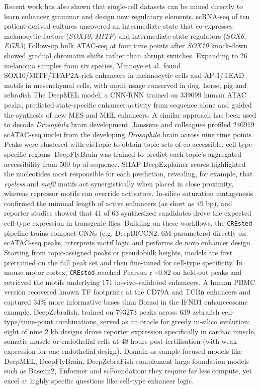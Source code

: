 Recent work has also shown that single-cell datasets can be mined directly to learn enhancer grammar and design new regulatory elements. scRNA-seq of ten patient-derived cultures uncovered an intermediate state that co-expresses melanocytic factors (\textit{SOX10}, \textit{MITF}) and intermediate-state regulators (\textit{SOX6}, \textit{EGR3}) Follow-up bulk ATAC-seq at four time points after \textit{SOX10} knock-down showed gradual chromatin shifts rather than abrupt switches. Expanding to 26 melanoma samples from six species, Minnoye et al. found SOX10/MITF/TFAP2A-rich enhancers in melanocytic cells and AP-1/TEAD motifs in mesenchymal cells, with motif usage conserved in dog, horse, pig and zebrafish The DeepMEL model, a CNN-RNN trained on \num{339099} human ATAC peaks, predicted state-specific enhancer activity from sequence alone and guided the synthesis of new MES and MEL enhancers. A similar approach has been used to decode \textit{Drosophila} brain development. Janssens and colleagues profiled \num{240919} scATAC-seq nuclei from the developing \textit{Drosophila} brain across nine time points Peaks were clustered with cisTopic to obtain topic sets of co-accessible, cell-type-specific regions. DeepFlyBrain was trained to predict each topic's aggregated accessibility from 500 bp of sequence. SHAP DeepExplainer scores highlighted the nucleotides most responsible for each prediction, revealing, for example, that \textit{eyeless} and \textit{mef2} motifs act synergistically when placed in close proximity, whereas repressor motifs can override activators. In-silico saturation mutagenesis confirmed the minimal length of active enhancers (as short as 49 bp), and reporter studies showed that 41 of 63 synthesized candidates drove the expected cell-type expression in transgenic flies. Building on these workflows, the \verb|CREsted| pipeline trains compact CNNs (e.g. DeepBICCN2, 6M parameters) directly on scATAC-seq peaks, interprets motif logic and performs de novo enhancer design. Starting from topic-assigned peaks or pseudobulk heights, models are first pretrained on the full peak set and then fine-tuned for cell-type specificity. In mouse motor cortex, \verb|CREsted| reached Pearson r \textasciitilde 0.82 on held-out peaks and retrieved the motifs underlying 171 in-vivo-validated enhancers. A human PBMC version recovered known TF footprints at the CD79A and TCR{\greekfont α}{} enhancers and captured 34\% more informative bases than Borzoi in the IFNB1 enhanceosome example. DeepZebrafish, trained on \num{793273} peaks across \num{639} zebrafish cell-type/time-point combinations, served as an oracle for greedy in-silico evolution: eight of nine 2 kb designs drove reporter expression specifically in cardiac muscle, somatic muscle or endothelial cells at 48 hours post fertilisation (with weak expression for one endothelial design). Domain or sample-focused models like DeepMEL, DeepFlyBrain, DeepZebraFish complement large foundation models such as Basenji2, Enformer and scFoundation: they require far less compute, yet excel at highly specific questions like cell-type enhancer logic.

